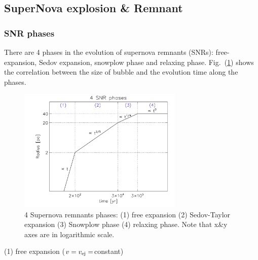 \bigskip
\subsection{SuperNova explosion \& Remnant}

\subsubsection{SNR phases}

There are 4 phases in the evolution of supernova remnants (SNRs): free-expansion, Sedov expansion, snowplow phase and relaxing phase.
Fig.~(\ref{fig:SNRphase}) shows the correlation between the size of bubble and the evolution time along the phases.

\begin{figure}[!htbp]
    \centering
    \includegraphics[width=0.7\textwidth]{HighEnergy/SNRphase}
    \caption{4 Supernova remnants phases: (1) free expansion (2) Sedov-Taylor expansion (3) Snowplow phase (4) relaxing phase.
            Note that x\&y axes are in logarithmic scale.}
    \label{fig:SNRphase}
\end{figure}

\noi (1) free expansion ($v=v_{\rm ej}=$constant)

